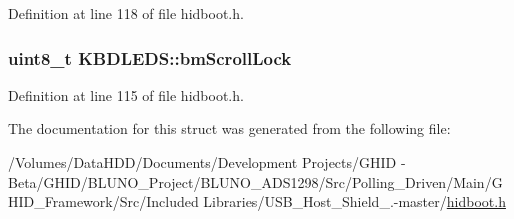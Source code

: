 \-Definition at line 118 of file hidboot.\-h.

\hypertarget{struct_k_b_d_l_e_d_s_adf2e5ff049894e40b0fab7d830f3c393}{
\subsubsection[{bm\-Scroll\-Lock}]{\setlength{\rightskip}{0pt plus 5cm}uint8\-\_\-t {\bf \-K\-B\-D\-L\-E\-D\-S\-::bm\-Scroll\-Lock}}}\label{struct_k_b_d_l_e_d_s_adf2e5ff049894e40b0fab7d830f3c393}


\-Definition at line 115 of file hidboot.\-h.



\-The documentation for this struct was generated from the following file\-:\begin{DoxyCompactItemize}
\item 
/\-Volumes/\-Data\-H\-D\-D/\-Documents/\-Development Projects/\-G\-H\-I\-D -\/ Beta/\-G\-H\-I\-D/\-B\-L\-U\-N\-O\-\_\-\-Project/\-B\-L\-U\-N\-O\-\_\-\-A\-D\-S1298/\-Src/\-Polling\-\_\-\-Driven/\-Main/\-G\-H\-I\-D\-\_\-\-Framework/\-Src/\-Included Libraries/\-U\-S\-B\-\_\-\-Host\-\_\-\-Shield\-\_.-\/master/\hyperlink{hidboot_8h}{hidboot.\-h}\end{DoxyCompactItemize}
